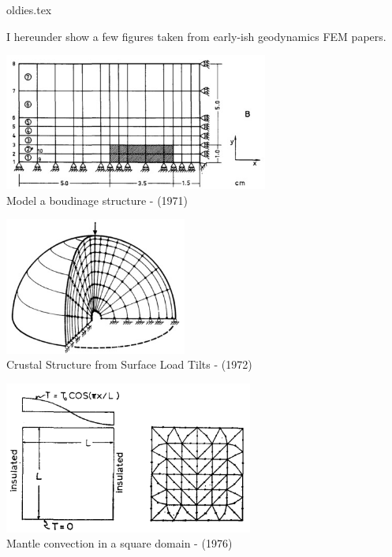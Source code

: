 \begin{flushright} {\tiny {\color{gray} oldies.tex}} \end{flushright}

I hereunder show a few figures taken from early-ish geodynamics FEM papers.


\begin{center}
\begin{minipage}{0.45\textwidth}
\centering
\includegraphics[height=4.5cm]{images/history/stbe71}\\
{\captionfont Model a boudinage structure - \textcite{stbe71} (1971)}
\end{minipage}\hfill
\begin{minipage}{0.45\textwidth}
\centering
\includegraphics[height=4.5cm]{images/history/bela72}\\
{\captionfont Crustal Structure from Surface Load Tilts - \textcite{bela72} (1972)}
\end{minipage}
\end{center}


\begin{center}
\includegraphics[height=5cm]{images/history/sath76}\\
{\captionfont Mantle convection in a square domain - \textcite{sath76} (1976)}
\end{center}

